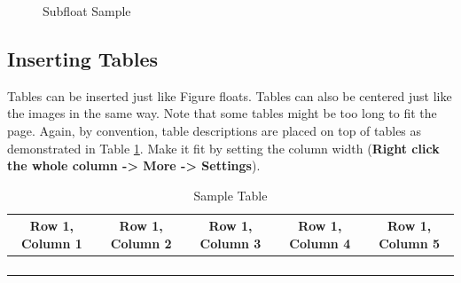 \documentclass[english]{upeeei}
\providecommand{\tabularnewline}{\\}
\begin{document}
\begin{figure}[H]
\begin{centering}
\par\end{centering}
\begin{centering}
\par\end{centering}
\caption{Subfloat Sample\label{fig:Subfloat-Sample}}
\end{figure}


\subsection{Inserting Tables}

Tables can be inserted just like Figure floats. Tables can also be
centered just like the images in the same way. Note that some tables
might be too long to fit the page. Again, by convention, table descriptions
are placed on top of tables as demonstrated in Table \ref{tab:Sample-Table}.
Make it fit by setting the column width (\textbf{Right click the whole
column -\textgreater{} More -\textgreater{} Settings}). 

\begin{table}[H]
\caption{Sample Table \label{tab:Sample-Table}}

\centering{}%
\begin{tabular}{|c|c|c|c|c|}
\hline 
Row 1, Column 1 & Row 1, Column 2 & Row 1, Column 3 & Row 1, Column 4 & Row 1, Column 5\tabularnewline
\hline 
\hline 
 &  &  &  & \tabularnewline
\hline 
 &  &  &  & \tabularnewline
\hline 
 &  &  &  & \tabularnewline
\hline 
 &  &  &  & \tabularnewline
\hline 
\end{tabular}
\end{table}
\end{document}

